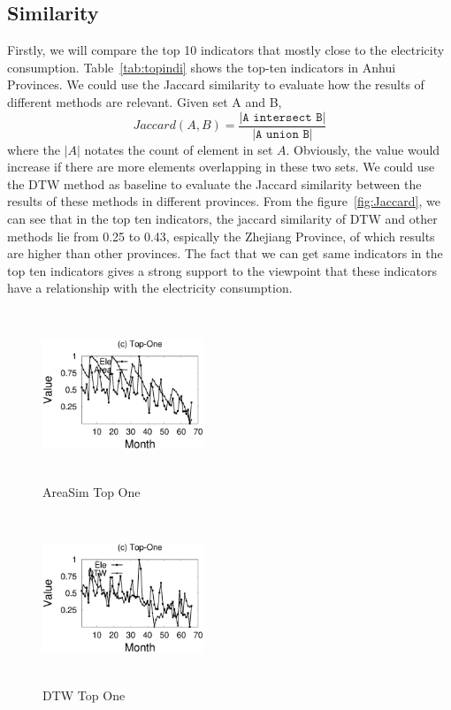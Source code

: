 \subsection{Similarity}
Firstly, we will compare the top 10 indicators that mostly close to the electricity consumption. Table~\ref{tab:topindi} shows the top-ten indicators in Anhui Provinces. We could use the Jaccard similarity to evaluate how the results of different methods are relevant. Given set A and B, 
\begin{equation}
	Jaccard(A, B) = \frac{\texttt{|A intersect B|}}{\texttt{|A union B|}}
\end{equation} 
where the $|A|$ notates the count of element in set $A$. Obviously, the value would increase if there are more elements overlapping in these two sets. We could use the DTW method as baseline to evaluate the Jaccard similarity between the results of these methods in different provinces. From the figure~\ref{fig:Jaccard}, we can see that in the top ten indicators, the jaccard similarity of DTW and other methods lie from 0.25 to 0.43, espically the Zhejiang Province, of which results are higher than other provinces. The fact that we can get same indicators in the top ten indicators gives a strong support to the viewpoint that these indicators have a relationship with the electricity consumption.

\begin{figure}
	\centering
	\includegraphics[height=2in, width=1.9in]{area-ele}
	\caption{AreaSim Top One}
	\label{fig:AreaSim}
\end{figure}

\begin{figure}
	\centering
	\includegraphics[height=2in, width=1.9in]{dtw_ele}
	\caption{DTW Top One}
	\label{fig:DTW}	
\end{figure}

